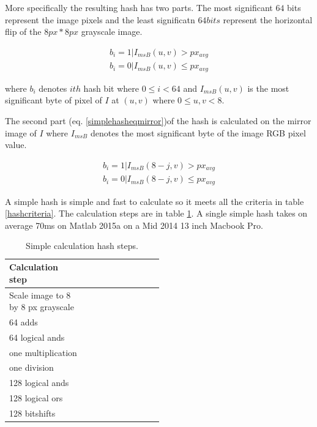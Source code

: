 \documentclass[english,12pt,a4paper,pdftex,elec,utf8]{aaltothesis}
\begin{document}
More specifically the resulting hash has two parts. The most significant $64$ bits represent the image pixels and the least significatn $64bits$ represent the horizontal flip of the $8px * 8px$ grayscale image.

\begin{equation} \label{simplehasheq}
  \begin{split}
  b_{i} = 1 | I_{msB}(u,v) > px_{avg}\\
  b_{i} = 0 | I_{msB}(u,v) \leq px_{avg}
  \end{split}
\end{equation}

where $b_{i}$ denotes $ith$ hash bit where $0 \leq i < 64$ and $I_{msB}(u,v)$ is the most significant byte of pixel of $I$ at $(u,v)$ where $0 \leq u,v < 8$.

The second part (eq. \ref{simplehasheqmirror})of the hash is calculated on the mirror image of $I$ where $I_{msB}$ denotes the most significant byte of the image RGB pixel value.

\begin{equation} \label{simplehasheqmirror}
  \begin{split}
  b_{i} = 1 | I_{msB}(8-j,v) > px_{avg}\\
  b_{i} = 0 | I_{msB}(8-j,v) \leq px_{avg}
  \end{split}
\end{equation}

A simple hash is simple and fast to calculate so it meets all the criteria in table \ref{hashcriteria}. The calculation steps are in table \ref{simplesteps}. A single simple hash takes on average 70ms on Matlab 2015a on a Mid 2014 13 inch Macbook Pro.

\def\arraystretch{1.5}
\begin{table}[htb]
\caption{Simple calculation hash steps.}
\label{simplesteps}
\begin{center}
\begin{tabular}{lp{0.5\linewidth}}
  Calculation step\\
  \hline \hline
  Scale image to 8 by 8 px grayscale\\
  \hline
  64 adds\\
  \hline
  64 logical ands\\
  \hline
  one multiplication\\
  \hline
  one division\\
  \hline
  128 logical ands\\
  \hline
  128 logical ors\\
  \hline
  128 bitshifts\\
  \hline
\end{tabular}
\end{center}\end{table}
\end{document}
